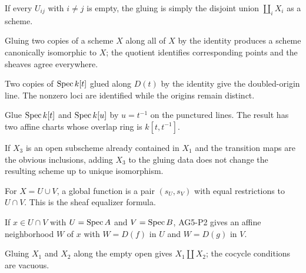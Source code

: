 \begin{example}
If every $U_{ij}$ with $i\ne j$ is empty, the gluing is simply the disjoint union $\coprod_i X_i$ as a scheme.
\end{example}

\begin{example}
Gluing two copies of a scheme $X$ along all of $X$ by the identity produces a scheme canonically isomorphic to $X$; the quotient identifies corresponding points and the sheaves agree everywhere.
\end{example}

\begin{example}
Two copies of $\operatorname{Spec} k[t]$ glued along $D(t)$ by the identity give the doubled-origin line.  The nonzero loci are identified while the origins remain distinct.
\end{example}

\begin{example}
Glue $\operatorname{Spec} k[t]$ and $\operatorname{Spec} k[u]$ by $u=t^{-1}$ on the punctured lines.  The result has two affine charts whose overlap ring is $k[t,t^{-1}]$.
\end{example}

\begin{example}
If $X_3$ is an open subscheme already contained in $X_1$ and the transition maps are the obvious inclusions, adding $X_3$ to the gluing data does not change the resulting scheme up to unique isomorphism.
\end{example}

\begin{example}
For $X=U\cup V$, a global function is a pair $(s_U,s_V)$ with equal restrictions to $U\cap V$.  This is the sheaf equalizer formula.
\end{example}

\begin{example}
If $x\in U\cap V$ with $U=\operatorname{Spec} A$ and $V=\operatorname{Spec} B$, AG5-P2 gives an affine neighborhood $W$ of $x$ with $W=D(f)$ in $U$ and $W=D(g)$ in $V$.
\end{example}

\begin{example}
Gluing $X_1$ and $X_2$ along the empty open gives $X_1\amalg X_2$; the cocycle conditions are vacuous.
\end{example}

